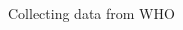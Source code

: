 \documentclass[xcolor=x11names, aspectratio=169, compress]{beamer}
\renewcommand{\(}{\begin{columns}}
\renewcommand{\)}{\end{columns}}
\newcommand{\<}[1]{\begin{column}{#1}}
\renewcommand{\>}{\end{column}}
\begin{document}
\begin{frame}{Collecting data from WHO}
\begin{columns}[T]
\begin{column}{0.8\textwidth}
\begin{center}
\begin{itemize}

\end{itemize}
\end{center}
\end{column}
\end{columns}
\end{frame}
\end{document}
